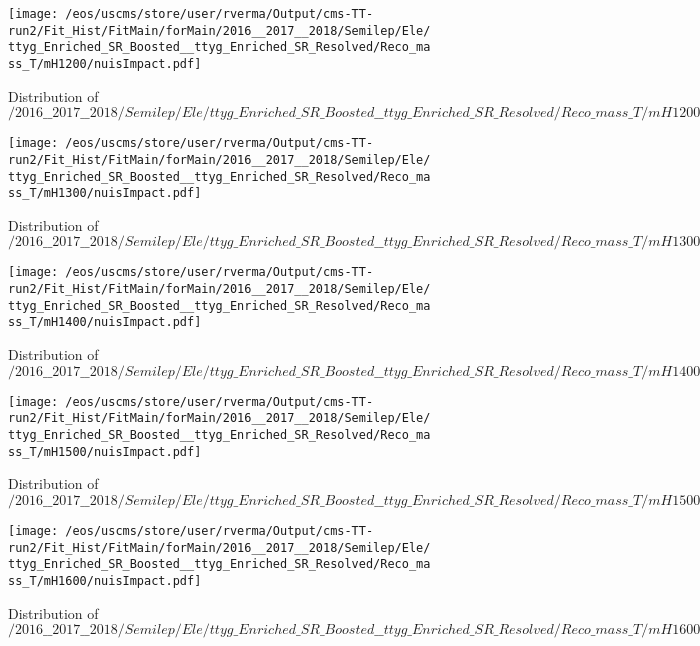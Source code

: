 \begin{figure}
\centering
\texttt{[image: /eos/uscms/store/user/rverma/Output/cms-TT-run2/Fit\_Hist/FitMain/forMain/2016\_\_2017\_\_2018/Semilep/Ele/ttyg\_Enriched\_SR\_Boosted\_\_ttyg\_Enriched\_SR\_Resolved/Reco\_mass\_T/mH1200/nuisImpact.pdf]}
\caption{Distribution of $/2016\_\_2017\_\_2018/Semilep/Ele/ttyg\_Enriched\_SR\_Boosted\_\_ttyg\_Enriched\_SR\_Resolved/Reco\_mass\_T/mH1200/nuisImpact.pdf$}
\end{figure}

\begin{figure}
\centering
\texttt{[image: /eos/uscms/store/user/rverma/Output/cms-TT-run2/Fit\_Hist/FitMain/forMain/2016\_\_2017\_\_2018/Semilep/Ele/ttyg\_Enriched\_SR\_Boosted\_\_ttyg\_Enriched\_SR\_Resolved/Reco\_mass\_T/mH1300/nuisImpact.pdf]}
\caption{Distribution of $/2016\_\_2017\_\_2018/Semilep/Ele/ttyg\_Enriched\_SR\_Boosted\_\_ttyg\_Enriched\_SR\_Resolved/Reco\_mass\_T/mH1300/nuisImpact.pdf$}
\end{figure}

\begin{figure}
\centering
\texttt{[image: /eos/uscms/store/user/rverma/Output/cms-TT-run2/Fit\_Hist/FitMain/forMain/2016\_\_2017\_\_2018/Semilep/Ele/ttyg\_Enriched\_SR\_Boosted\_\_ttyg\_Enriched\_SR\_Resolved/Reco\_mass\_T/mH1400/nuisImpact.pdf]}
\caption{Distribution of $/2016\_\_2017\_\_2018/Semilep/Ele/ttyg\_Enriched\_SR\_Boosted\_\_ttyg\_Enriched\_SR\_Resolved/Reco\_mass\_T/mH1400/nuisImpact.pdf$}
\end{figure}

\begin{figure}
\centering
\texttt{[image: /eos/uscms/store/user/rverma/Output/cms-TT-run2/Fit\_Hist/FitMain/forMain/2016\_\_2017\_\_2018/Semilep/Ele/ttyg\_Enriched\_SR\_Boosted\_\_ttyg\_Enriched\_SR\_Resolved/Reco\_mass\_T/mH1500/nuisImpact.pdf]}
\caption{Distribution of $/2016\_\_2017\_\_2018/Semilep/Ele/ttyg\_Enriched\_SR\_Boosted\_\_ttyg\_Enriched\_SR\_Resolved/Reco\_mass\_T/mH1500/nuisImpact.pdf$}
\end{figure}

\begin{figure}
\centering
\texttt{[image: /eos/uscms/store/user/rverma/Output/cms-TT-run2/Fit\_Hist/FitMain/forMain/2016\_\_2017\_\_2018/Semilep/Ele/ttyg\_Enriched\_SR\_Boosted\_\_ttyg\_Enriched\_SR\_Resolved/Reco\_mass\_T/mH1600/nuisImpact.pdf]}
\caption{Distribution of $/2016\_\_2017\_\_2018/Semilep/Ele/ttyg\_Enriched\_SR\_Boosted\_\_ttyg\_Enriched\_SR\_Resolved/Reco\_mass\_T/mH1600/nuisImpact.pdf$}
\end{figure}

